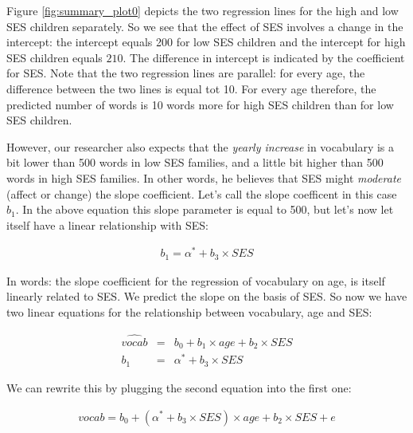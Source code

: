 Figure \ref{fig:summary_plot0} depicts the two regression lines for the high and low SES children separately. So we see that the effect of SES involves a change in the intercept: the intercept equals 200 for low SES children and the intercept for high SES children equals $210$. The difference in intercept is indicated by the coefficient for SES. Note that the two regression lines are parallel: for every age, the difference between the two lines is equal tot 10. For every age therefore, the predicted number of words is 10 words more for high SES children than for low SES children.


\begin{knitrout}
\color{fgcolor}\begin{kframe}


{\ttfamily\noindent\bfseries{}}\end{kframe}
\end{knitrout}

However, our researcher also expects that the \textit{yearly increase} in vocabulary is a bit lower than 500 words in low SES families, and a little bit higher than 500 words in high SES families. In other words, he believes that SES might \textit{moderate} (affect or change) the slope coefficient. Let's call the slope coefficent in this case $b_1$. In the above equation this slope parameter is equal to 500, but let's now let itself have a linear relationship with SES:

\begin{eqnarray}
b_1 = \alpha^* + b_3 \times SES
\end{eqnarray}

In words: the slope coefficient for the regression of vocabulary on age, is itself linearly related to SES. We predict the slope on the basis of SES. So now we have two linear equations for the relationship between vocabulary, age and SES:

\begin{eqnarray}
\widehat{vocab} &=& b_0 + b_1 \times age + b_2 \times SES  \\
b_1 &=& \alpha^* + b_3 \times SES
\end{eqnarray}

We can rewrite this by plugging the second equation into the first one:

\begin{eqnarray}
vocab = b_0 + (\alpha^* + b_3 \times SES)  \times age + b_2 \times SES + e
\end{eqnarray}


